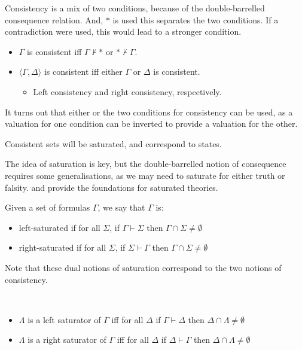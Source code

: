 \documentclass[10pt]{article}
\begin{document}
\begin{definition}[Consistency]
  Consistency is a mix of two conditions, because of the double-barrelled consequence relation.
  And, \(\ast\) is used this separates the two conditions.
  If a contradiction were used, this would lead to a stronger condition.
  \begin{itemize}
  \item \(\Gamma\) is consistent iff \(\Gamma \nvdash \ast\) or \(\ast \nvdash \Gamma\).
  \item \(\langle \Gamma,\Delta \rangle\) is consistent iff either \(\Gamma\) or \(\Delta\) is consistent.
    \begin{itemize}
    \item Left consistency and right consistency, respectively.
    \end{itemize}
  \end{itemize}
  It turns out that either or the two conditions for consistency can be used, as a valuation for one condition can be inverted to provide a valuation for the other.
\end{definition}

Consistent sets will be saturated, and correspond to states.

The idea of saturation is key, but the double-barrelled notion of consequence requires some generalisations, as we may need to saturate for either truth or falsity.
\cite{Thomason:1968aa} and \cite{Aczel:1968aa} provide the foundations for saturated theories.

\begin{definition}[Saturation]
  Given a set of formulas \(\Gamma\), we say that \(\Gamma\) is:
  \begin{itemize}
  \item left-saturated if for all \(\Sigma\), if \(\Gamma \vdash \Sigma\) then \(\Gamma \cap \Sigma \ne \emptyset\)
  \item right-saturated if for all \(\Sigma\), if \(\Sigma \vdash \Gamma\) then \(\Gamma \cap \Sigma \ne \emptyset\)
  \end{itemize}
\end{definition}

Note that these dual notions of saturation correspond to the two notions of consistency.

\begin{definition}[Saturators]
  \mbox{ }
  \begin{itemize}
  \item \(\Lambda\) is a left saturator of \(\Gamma\) iff for all \(\Delta\) if \(\Gamma \vdash \Delta\) then \(\Delta \cap \Lambda \ne \emptyset\)
  \item \(\Lambda\) is a right saturator of \(\Gamma\) iff for all \(\Delta\) if \(\Delta \vdash \Gamma\) then \(\Delta \cap \Lambda \ne \emptyset\)
  \end{itemize}
\end{definition}
\end{document}
